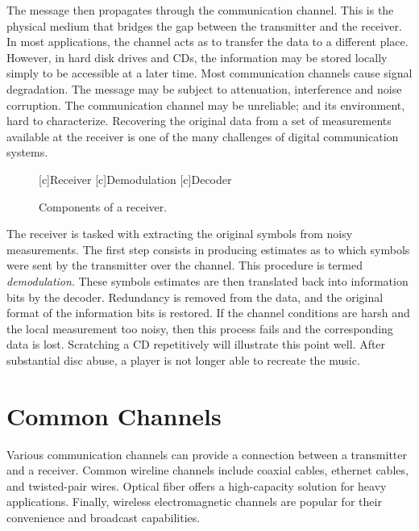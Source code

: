 The message then propagates through the communication channel.
This is the physical medium that bridges the gap between the transmitter and the receiver.
In most applications, the channel acts as to transfer the data to a different place.
However, in hard disk drives and CDs, the information may be stored locally simply to be accessible at a later time.
Most communication channels cause signal degradation.
The message  may be subject to attenuation, interference and noise corruption.
The communication channel may be unreliable; and its environment, hard to characterize.
Recovering the original data from a set of measurements available at the receiver is one of the many challenges of digital communication systems.

\begin{figure}[htbp]
\begin{center}
\begin{psfrags}
[c]{Receiver}
[c]{Demodulation}
[c]{Decoder}
\end{psfrags}
\end{center}
\caption{Components of a receiver.}
\label{figure:BlockReceiver}
\end{figure}

The receiver is tasked with extracting the original symbols from noisy measurements.
The first step consists in producing estimates as to which symbols were sent by the transmitter over the channel.
This procedure is termed \emph{demodulation}.
These symbols estimates are then translated back into information bits by the decoder.
Redundancy is removed from the data, and the original format of the information bits is restored.
If the channel conditions are harsh and the local measurement too noisy, then this process fails and the corresponding data is lost.
Scratching a CD repetitively will illustrate this point well.
After substantial disc abuse, a player is not longer able to recreate the music.


\section{Common Channels}

Various communication channels can provide a connection between a transmitter and a receiver.
Common wireline channels include coaxial cables, ethernet cables, and twisted-pair wires.
Optical fiber offers a high-capacity solution for heavy applications.
Finally, wireless electromagnetic channels are popular for their convenience and broadcast capabilities.



